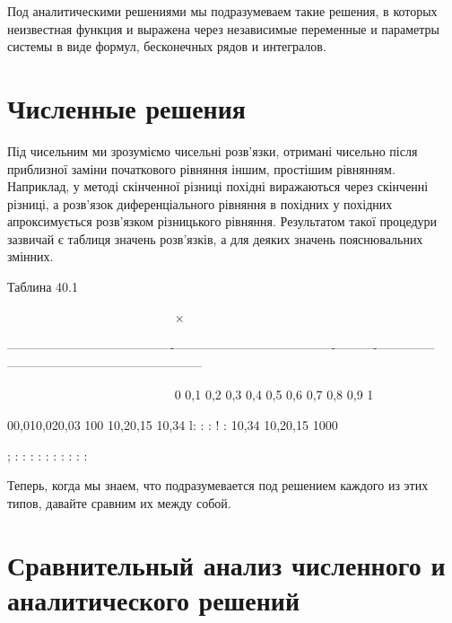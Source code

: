 \documentclass[
  ukrainian,
]{article}
\begin{document}
Под аналитическими решениями мы подразумеваем такие решения, в которых
неизвестная функция и выражена через независимые переменные и параметры
системы в виде формул, бесконечных рядов и интегралов.

\section{Численные
решения}\label{ux447ux438ux441ux43bux435ux43dux43dux44bux435-ux440ux435ux448ux435ux43dux438ux44f}

Під чисельним ми зрозуміємо чисельні розв'язки, отримані чисельно після
приблизної заміни початкового рівняння іншим, простішим рівнянням.
Наприклад, у методі скінченної різниці похідні виражаються через
скінченні різниці, а розв'язок диференціального рівняння в похідних у
похідних апроксимується розв'язком різницького рівняння. Результатом
такої процедури зазвичай є таблиця значень розв'язків, а для деяких
значень пояснювальних змінних.

Таблина 40.1

~~~~~~~~~~~~~~~~~~~~~~~~~~\textbar{} × \textbar{} \textbar{} \textbar{}
\textbar{} \textbar{} \textbar{} \textbar{} \textbar{} \textbar{}
\textbar{} \textbar{}

\textbar---------------------------\textbar-------------\textbar------------------\textbar-----------\textbar----------\textbar----------\textbar-----\textbar-----\textbar-----\textbar-----------\textbar------------------\textbar------------------\textbar{}

~~~~~~~~~~~~~~~~~~~~~~~~~~\textbar{} 0 \textbar{} 0,1 \textbar{} 0,2
\textbar{} 0,3 \textbar{} 0,4 \textbar{} 0,5 \textbar{} 0,6 \textbar{}
0,7 \textbar{} 0,8 \textbar{} 0,9 \textbar{} 1 \textbar{}

00,010,020,03 \textbar{} 100 \textbar{} 10,20,15 \textbar{} 10,34
\textbar{} l: \textbar{} : \textbar{} : \textbar{} ! \textbar{} :
\textbar{} 10,34 \textbar{} 10,20,15 \textbar{} 1000 \textbar{}

; \textbar{} \textbar{} : \textbar{} : \textbar{} : \textbar{} :
\textbar{} : \textbar{} : \textbar{} : \textbar{} : \textbar{} :
\textbar{} : \textbar{}

Теперь, когда мы знаем, что подразумевается под решением каждого из этих
типов, давайте сравним их между собой.

\section{\texorpdfstring{\textbf{Сравнительный анализ численного} и
аналитического
решений}{Сравнительный анализ численного и аналитического решений}}\label{ux441ux440ux430ux432ux43dux438ux442ux435ux43bux44cux43dux44bux439-ux430ux43dux430ux43bux438ux437-ux447ux438ux441ux43bux435ux43dux43dux43eux433ux43e-ux438-ux430ux43dux430ux43bux438ux442ux438ux447ux435ux441ux43aux43eux433ux43e-ux440ux435ux448ux435ux43dux438ux439}
\end{document}
